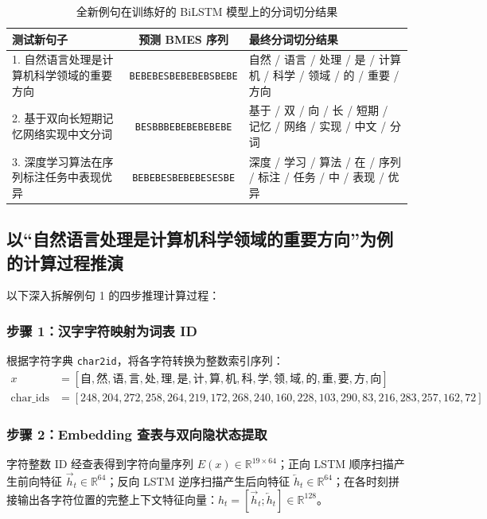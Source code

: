 \documentclass[11pt,a4paper]{ctexart}
\begin{document}
\begin{table}[H]
    \centering
    \small
    \caption{全新例句在训练好的 BiLSTM 模型上的分词切分结果}
    \label{tab:new_sents}
    \begin{tabular}{p{5.4cm}cp{5.2cm}}
        \toprule
        \textbf{测试新句子} & \textbf{预测 BMES 序列} & \textbf{最终分词切分结果} \\
        \midrule
        1. 自然语言处理是计算机科学领域的重要方向 & \texttt{BEBEBESBEBEBEBSBEBE} & 自然 / 语言 / 处理 / 是 / 计算机 / 科学 / 领域 / 的 / 重要 / 方向 \\
        2. 基于双向长短期记忆网络实现中文分词 & \texttt{BESBBBEBEBEBEBEBE} & 基于 / 双 / 向 / 长 / 短期 / 记忆 / 网络 / 实现 / 中文 / 分词 \\
        3. 深度学习算法在序列标注任务中表现优异 & \texttt{BEBEBESBEBEBESESBE} & 深度 / 学习 / 算法 / 在 / 序列 / 标注 / 任务 / 中 / 表现 / 优异 \\
        \bottomrule
    \end{tabular}
\end{table}

\subsection{以“自然语言处理是计算机科学领域的重要方向”为例的计算过程推演}

以下深入拆解例句 1 的四步推理计算过程：

\subsubsection{步骤 1：汉字字符映射为词表 ID}

根据字符字典 \texttt{char2id}，将各字符转换为整数索引序列：
\begin{align*}
    x &= [\text{自}, \text{然}, \text{语}, \text{言}, \text{处}, \text{理}, \text{是}, \text{计}, \text{算}, \text{机}, \text{科}, \text{学}, \text{领}, \text{域}, \text{的}, \text{重}, \text{要}, \text{方}, \text{向}] \\
    \text{char\_ids} &= [248, 204, 272, 258, 264, 219, 172, 268, 240, 160, 228, 103, 290, 83, 216, 283, 257, 162, 72]
\end{align*}

\subsubsection{步骤 2：Embedding 查表与双向隐状态提取}

字符整数 ID 经查表得到字符向量序列 $E(x) \in \mathbb{R}^{19 \times 64}$；正向 LSTM 顺序扫描产生前向特征 $\overrightarrow{h}_t \in \mathbb{R}^{64}$；反向 LSTM 逆序扫描产生后向特征 $\overleftarrow{h}_t \in \mathbb{R}^{64}$；在各时刻拼接输出各字符位置的完整上下文特征向量：$h_t = [\overrightarrow{h}_t; \overleftarrow{h}_t] \in \mathbb{R}^{128}$。
\end{document}
